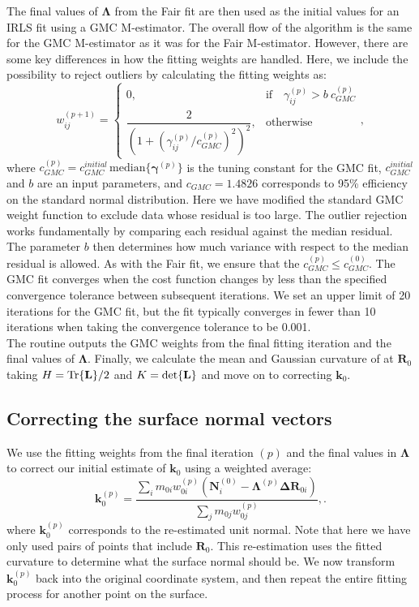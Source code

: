 The final values of $\bm{\Lambda}$ from the Fair fit are then used as the initial values for an IRLS fit using a GMC M-estimator.
The overall flow of the algorithm is the same for the GMC M-estimator as it was for the Fair M-estimator.
However, there are some key differences in how the fitting weights are handled.
Here, we include the possibility to reject outliers by calculating the fitting weights as:
\begin{equation}
  w_{ij}^{(p+1)} =
\begin{cases}
0, & \text{if} \quad \gamma_{ij}^{(p)} > b \ c_{GMC}^{(p)} \\
 \dfrac{2}{(1+(\gamma_{ij}^{(p)} / c_{GMC}^{(p)})^2)^2}, & \text{otherwise}
\end{cases},
\end{equation}
where $c_{GMC}^{(p)} = c_{GMC}^{initial} \, \textrm{median}\{ \bm{\gamma}^{(p)} \}$ is the tuning constant for the GMC fit, $c_{GMC}^{initial}$ and $b$ are an input parameters, and $c_{GMC} = 1.4826$ corresponds to 95\% efficiency on the standard normal distribution.
Here we have modified the standard GMC weight function to exclude data whose residual is too large.
The outlier rejection works fundamentally by comparing each residual against the median residual.
The parameter $b$ then determines how much variance with respect to the median residual is allowed.
As with the Fair fit, we ensure that the $c_{GMC}^{(p)} \leq c_{GMC}^{(0)}$.
The GMC fit converges when the cost function changes by less than the specified convergence tolerance between subsequent iterations.
We set an upper limit of 20 iterations for the GMC fit, but the fit typically converges in fewer than 10 iterations when taking the convergence tolerance to be 0.001. \\

The routine outputs the GMC weights from the final fitting iteration and the final values of $\bm{\Lambda}$.
Finally, we calculate the mean and Gaussian curvature of at $\mathbf{R}_0$ taking $H = \textup{Tr}\{ \mathbf{L} \}/2$ and $K = \textup{det}\{ \mathbf{L} \}$ and move on to correcting $\mathbf{k}_0$.


\subsection{Correcting the surface normal vectors}
We use the fitting weights from the final iteration $(p)$ and the final values in $\bm{\Lambda}$ to correct our initial estimate of $\mathbf{k}_0$ using a weighted average:
\begin{equation}
\mathbf{k}_0^{(p)} = \frac{\sum\limits_i m_{0i}w_{0i}^{(p)}(\mathbf{N}_i^{(0)} - \mathbf{\Lambda}^{(p)}\mathbf{\Delta R}_{0i})}{\sum\limits_j m_{0j}w_{0j}^{(p)}},.
\end{equation}
where $\mathbf{k}_0^{(p)}$ corresponds to the re-estimated unit normal.
Note that here we have only used pairs of points that include $\mathbf{R}_0$.
This re-estimation uses the fitted curvature to determine what the surface normal should be.
We now transform $\mathbf{k}_0^{(p)}$ back into the original coordinate system, and then repeat the entire fitting process for another point on the surface.


